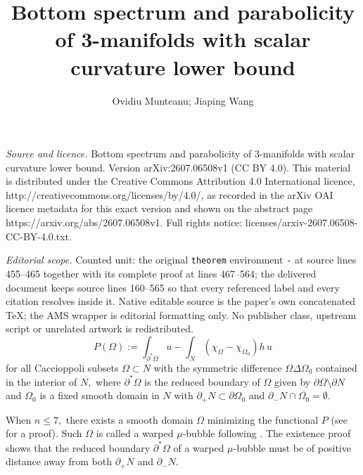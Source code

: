 \documentclass[10pt,a4paper]{amsart}
\numberwithin{equation}{section}
\begin{document}
\title[Bottom spectrum and parabolicity of 3-manifolds with scalar ]{Bottom spectrum and parabolicity of 3-manifolds with scalar curvature lower bound}
\author{Ovidiu Munteanu; Jiaping Wang}
\date{}
\maketitle
\noindent\emph{Source and licence.} Bottom spectrum and parabolicity of 3-manifolds with scalar curvature lower bound. Version arXiv:2607.06508v1 (CC BY 4.0). This material is distributed under the Creative Commons Attribution 4.0 International licence, http://creativecommons.org/licenses/by/4.0/, as recorded in the arXiv OAI licence metadata for this exact version and shown on the abstract page https://arxiv.org/abs/2607.06508v1. Full rights notice: licenses/arxiv-2607.06508-CC-BY-4.0.txt.\par\smallskip
\noindent\textit{Editorial scope.} Counted unit: the original \texttt{theorem} environment \texttt{-} at source lines 455--465 together with its complete proof at lines 467--564; the delivered document keeps source lines 160--565 so that every referenced label and every citation resolves inside it. Native editable source is the paper's own concatenated TeX; the AMS wrapper is editorial formatting only. No publisher class, upstream script or unrelated artwork is redistributed.
\begin{equation}
P\left( \Omega \right) :=\int_{\partial ^{\ast }\Omega }u-\int_{N}\left(
\chi _{\Omega }-\chi _{\Omega _{0}}\right) h\,u \label{P}
\end{equation}
for all Caccioppoli subsets $\Omega\subset N$ with the symmetric difference
$\Omega\Delta \Omega_0$ contained in the interior of $N,$ where 
$\partial ^{\ast }\Omega$ is the reduced boundary of $\Omega$
given by $\partial \Omega\setminus \partial N$ and $\Omega_0$ is a fixed smooth domain in $N$
with $\partial_{+} N\subset \partial \Omega_0$ and $\partial_{-} N\cap \overline{\Omega_0}=\emptyset.$

When $n\leq 7,$ there exists a smooth domain $\Omega$ minimizing the functional $P$ (see \cite{Z, CL} for a proof). 
Such $\Omega$ is called a warped $\mu$-bubble following \cite{CL}. The existence proof shows that the reduced boundary
$\partial ^{\ast }\Omega$ of a warped $\mu$-bubble must be of positive distance away from both $\partial_{+} N$ and $\partial_{-} N.$
\end{document}
